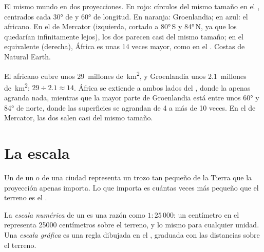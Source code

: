 \begin{omfigure}
{\small El mismo mundo en dos proyecciones. En rojo: círculos del mismo
tamaño en el , centrados cada \ang{30} de  y \ang{60} de
longitud. En naranja: Groenlandia; en azul: el  africano. En el
 de Mercator (izquierda, cortado a \ang{80}\,S y \ang{84}\,N, ya que
los  quedarían infinitamente lejos), los dos parecen casi del mismo
tamaño; en el  equivalente (derecha), África es unas 14 veces mayor,
como en el . Costas de Natural Earth.}
\label{fig:g9:maps-of-the-earth:projections}
\end{omfigure}

\begin{example}
El  africano cubre unos 29~millones de~\unit{km^2}, y
Groenlandia unos 2.1~millones de~\unit{km^2}: $29 \div 2.1 \approx 14$.
África se extiende a ambos lados del , donde la  apenas agranda nada, mientras que la mayor parte de Groenlandia
está entre unos \ang{60} y \ang{84} de  norte, donde las superficies
se agrandan de 4 a más de 10 veces. En el  de Mercator, las dos salen
casi del mismo tamaño.
\end{example}

\section{La escala}

Un  de un  o de una ciudad representa un trozo tan pequeño de la
Tierra que la proyección apenas importa. Lo que importa es cuántas veces
más pequeño que el terreno es el .

\begin{definition}\label{def:g9:maps-of-the-earth:numerical-scale}
La \emph{escala numérica} de un 
es una razón como $1 : 25\,000$: un centímetro en el  representa
\num{25000} centímetros sobre el terreno, y lo mismo para cualquier unidad.
Una \emph{escala gráfica} es una regla
dibujada en el , graduada con las distancias sobre el terreno.
\end{definition}

